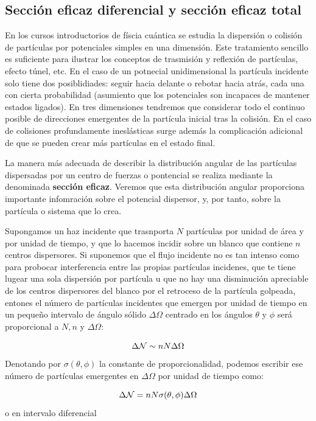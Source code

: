 \subsection{Sección eficaz diferencial y sección eficaz total}

En los cursos introductorios de físcia cuántica se estudia la dispersión o colisión de partículas por potenciales simples en una dimensión. Este tratamiento sencillo es suficiente para ilustrar los conceptos de trasmisión y reflexión de partículas, efecto túnel, etc. En el caso de un potnecial unidimensional la partícula incidente solo tiene dos posiblidiades: seguir hacia delante o rebotar hacia atrás, cada una con cierta probabilidad (asumiento que los potenciales son incapaces de mantener estados ligados). En tres dimensiones tendremos que considerar todo el continuo posible de direcciones emergentes de la partícula inicial tras la colisión. En el caso de colisiones profundamente ineslásticas surge además la complicación adicional de que se pueden crear más partículas en el estado final.

La manera más adecuada de describir la distribución angular de las partículas dispersadas por un centro de fuerzas o pontencial se realiza mediante la denominada \textbf{sección eficaz}. Veremos que esta distribución angular proporciona importante infomración sobre el potencial dispersor, y, por tanto, sobre la partícula o sistema que lo crea.

Supongamos un haz incidente que trasnporta $N$ partículas por unidad de área y por unidad de tiempo, y que lo hacemos incidir sobre un blanco que contiene $n$ centros dispersores. Si suponemos que el flujo incidente no es tan intenso como para probocar interferencia entre las propias partículas incidenes, que te tiene lugear una sola dispersión por partícula u que no hay una disminución apreciable de los centros dispersores del blanco por el retroceso de la partícula golpeada, entones el número de partículas incidentes que emergen por unidad de tiempo en un pequeño intervalo de ángulo sólido $\Delta \Omega$ centrado en los ángulos $\theta$ y $\phi$ será proporcional a $N,n$ y $\Delta \Omega$:

\begin{equation}
	\Delta \mathcal{N} \sim n N \Delta \Omega
\end{equation}
Denotando por $\sigma (\theta, \phi)$ la constante de proporcionalidad, podemos escribir ese número de partículas emergentes en $\Delta \Omega$ por unidad de tiempo como:

\begin{equation}
	\Delta \mathcal{N} = n N \sigma (\theta,\phi) \Delta \Omega
\end{equation}
o en intervalo diferencial

